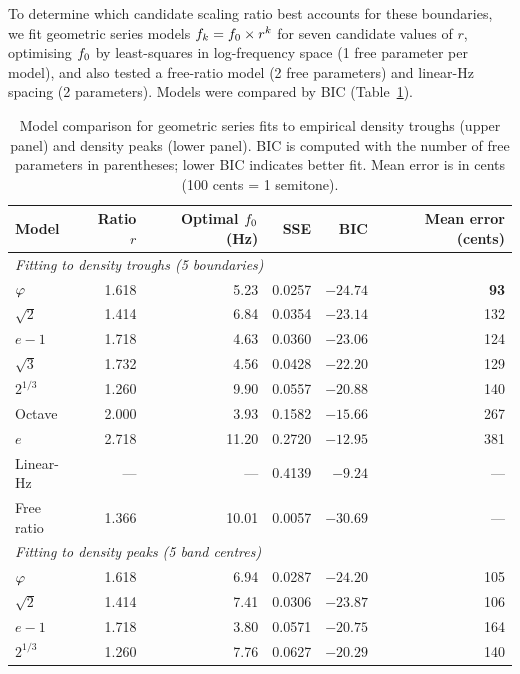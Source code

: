 To determine which candidate scaling ratio best accounts for these boundaries, we fit geometric series models $f_k = f_0 \times r^k$ for seven candidate values of $r$, optimising $f_0$ by least-squares in log-frequency space (1 free parameter per model), and also tested a free-ratio model (2 free parameters) and linear-Hz spacing (2 parameters). Models were compared by BIC (Table~\ref{tab:model_comparison}).

\begin{table}[h]
\centering
\caption{Model comparison for geometric series fits to empirical density troughs (upper panel) and density peaks (lower panel). BIC is computed with the number of free parameters in parentheses; lower BIC indicates better fit. Mean error is in cents (100 cents = 1 semitone).}
\label{tab:model_comparison}
\begin{threeparttable}
\begin{tabular}{l r r r r r}
\toprule
Model & Ratio $r$ & Optimal $f_0$ (Hz) & SSE & BIC & Mean error (cents) \\
\midrule
\multicolumn{6}{l}{\textit{Fitting to density troughs (5 boundaries)}} \\
\midrule
$\varphi$ & 1.618 & 5.23 & 0.0257 & $\mathbf{-24.74}$ & \textbf{93} \\
$\sqrt{2}$ & 1.414 & 6.84 & 0.0354 & $-23.14$ & 132 \\
$e - 1$   & 1.718 & 4.63 & 0.0360 & $-23.06$ & 124 \\
$\sqrt{3}$ & 1.732 & 4.56 & 0.0428 & $-22.20$ & 129 \\
$2^{1/3}$ & 1.260 & 9.90 & 0.0557 & $-20.88$ & 140 \\
Octave    & 2.000 & 3.93 & 0.1582 & $-15.66$ & 267 \\
$e$       & 2.718 & 11.20 & 0.2720 & $-12.95$ & 381 \\
Linear-Hz & ---   & ---  & 0.4139 & $-9.24$  & --- \\
Free ratio\tnote{a} & 1.366 & 10.01 & 0.0057 & $-30.69$ & --- \\
\midrule
\multicolumn{6}{l}{\textit{Fitting to density peaks (5 band centres)}} \\
\midrule
$\varphi$ & 1.618 & 6.94 & 0.0287 & $\mathbf{-24.20}$ & 105 \\
$\sqrt{2}$ & 1.414 & 7.41 & 0.0306 & $-23.87$ & 106 \\
$e - 1$   & 1.718 & 3.80 & 0.0571 & $-20.75$ & 164 \\
$2^{1/3}$ & 1.260 & 7.76  & 0.0627 & $-20.29$ & 140 \\

\end{tabular}
\end{threeparttable}
\end{table}
